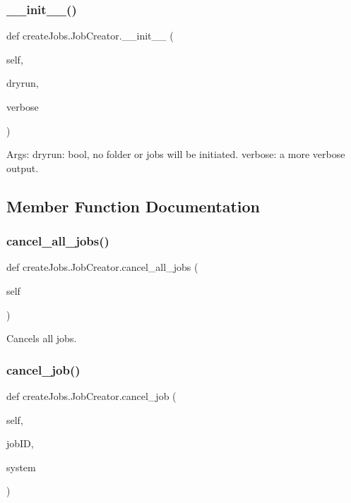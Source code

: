 \subsubsection{\texorpdfstring{\_\_init\_\_()}{\_\_init\_\_()}}
{\footnotesize\ttfamily def create\+Jobs.\+Job\+Creator.\+\_\+\+\_\+init\+\_\+\+\_\+ (\begin{DoxyParamCaption}\item[{}]{self,  }\item[{}]{dryrun,  }\item[{}]{verbose }\end{DoxyParamCaption})}

\begin{DoxyVerb}Args:
    dryrun: bool, no folder or jobs will be initiated.
    verbose: a more verbose output.
\end{DoxyVerb}
 

\subsection{Member Function Documentation}
\mbox{\label{classcreate_jobs_1_1_job_creator_a01cc2f73e0ef5907752b055543737bfa}} 
\subsubsection{\texorpdfstring{cancel\_all\_jobs()}{cancel\_all\_jobs()}}
{\footnotesize\ttfamily def create\+Jobs.\+Job\+Creator.\+cancel\+\_\+all\+\_\+jobs (\begin{DoxyParamCaption}\item[{}]{self }\end{DoxyParamCaption})}

\begin{DoxyVerb}Cancels all jobs.\end{DoxyVerb}
 \mbox{\label{classcreate_jobs_1_1_job_creator_a4fb879d60cf6a4acf21d74cc7f5fe781}} 
\subsubsection{\texorpdfstring{cancel\_job()}{cancel\_job()}}
{\footnotesize\ttfamily def create\+Jobs.\+Job\+Creator.\+cancel\+\_\+job (\begin{DoxyParamCaption}\item[{}]{self,  }\item[{}]{job\+ID,  }\item[{}]{system }\end{DoxyParamCaption})}

